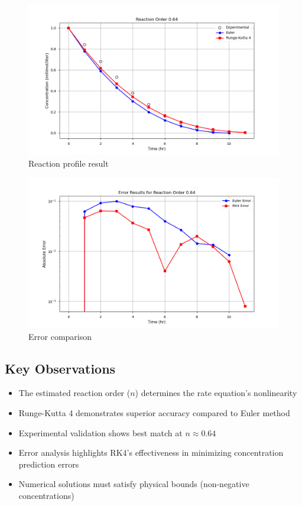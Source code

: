 \documentclass[10pt]{article}
\begin{document}
\begin{figure}[H]
    \centering
    \includegraphics[width=\imagewidth\textwidth]{figures/09_ODE/order_0.64_results.png}
    \caption{Reaction profile result}
\end{figure}
\begin{figure}[H]
    \centering
    \includegraphics[width=\imagewidth\textwidth]{figures/09_ODE/order_0.64_errors.png}
    \caption{Error comparison}
\end{figure}


\subsection{Key Observations}
\begin{itemize}
    \item The estimated reaction order (\( n \)) determines the rate equation's nonlinearity
    \item Runge-Kutta 4 demonstrates superior accuracy compared to Euler method
    \item Experimental validation shows best match at \( n \approx 0.64 \)
    \item Error analysis highlights RK4's effectiveness in minimizing concentration prediction errors
    \item Numerical solutions must satisfy physical bounds (non-negative concentrations)
\end{itemize}
\end{document}

